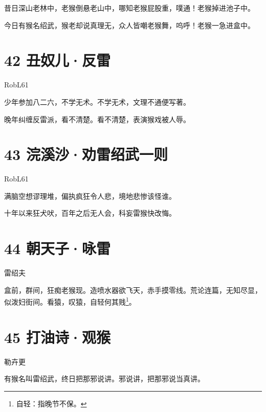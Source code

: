 \documentclass[UTF8,12pt,oneside]{ctexbook}
\begin{document}
        昔日深山老林中，老猴倒悬老山中，哪知老猴屁股重，噗通！老猴掉进池子中。
        
        今日有猴名绍武，猴老却说真理无，众人皆嘲老猴舞，呜呼！老猴一急进盒中。
        
        \section{42 丑奴儿·反雷}
        \begin{center}
            RobL61
        \end{center}
        
        少年参加八二六，不学无术。不学无术，文理不通便写著。
        
        晚年纠缠反雷派，看不清楚。看不清楚，表演猴戏被人辱。
        
        \newpage
        
        \section{43 浣溪沙·劝雷绍武一则}
        \begin{center}
            RobL61
        \end{center}
        
        满脑空想谬理堆，偏执疯狂令人悲，境地悲惨该怪谁。
        
        十年以来狂犬吠，百年之后无人会，科妄雷猴快改悔。
        
        \section{44 朝天子·咏雷}
        \begin{center}
            雷绍夫
        \end{center}
        
        盒前，群间，狂痴老猴现。造喷水器欲飞天，赤手摸零线。荒论连篇，无知尽显，似泼妇街间。看猿，叹猿，自轻何其贱\footnote{自轻：指晚节不保。}。
        
        \section{45 打油诗·观猴}
        \begin{center}
            勒卉更
        \end{center}
        
        有猴名叫雷绍武，终日把那邪说讲。邪说讲，把那邪说当真讲。
        
\end{document}
